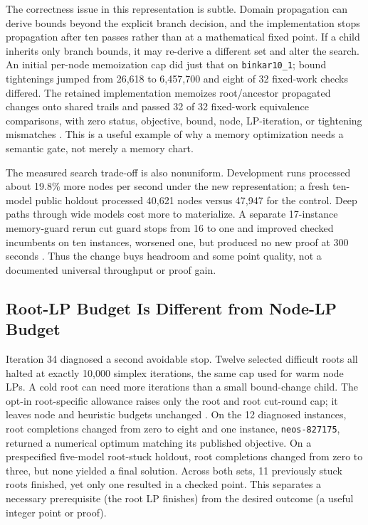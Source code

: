 \documentclass[10pt,a4paper,twocolumn]{article}
\begin{document}
The correctness issue in this representation is subtle. Domain propagation can derive bounds beyond the explicit branch decision, and the implementation stops propagation after ten passes rather than at a mathematical fixed point. If a child inherits only branch bounds, it may re-derive a different set and alter the search. An initial per-node memoization cap did just that on \texttt{binkar10\_1}; bound tightenings jumped from 26,618 to 6,457,700 and eight of 32 fixed-work checks differed. The retained implementation memoizes root/ancestor propagated changes onto shared trails and passed 32 of 32 fixed-work equivalence comparisons, with zero status, objective, bound, node, LP-iteration, or tightening mismatches \cite{iter33}. This is a useful example of why a memory optimization needs a semantic gate, not merely a memory chart.

The measured search trade-off is also nonuniform. Development runs processed about 19.8\% more nodes per second under the new representation; a fresh ten-model public holdout processed 40,621 nodes versus 47,947 for the control. Deep paths through wide models cost more to materialize. A separate 17-instance memory-guard rerun cut guard stops from 16 to one and improved checked incumbents on ten instances, worsened one, but produced no new proof at 300 seconds \cite{iter33}. Thus the change buys headroom and some point quality, not a documented universal throughput or proof gain.

\subsection{Root-LP Budget Is Different from Node-LP Budget}

Iteration 34 diagnosed a second avoidable stop. Twelve selected difficult roots all halted at exactly 10,000 simplex iterations, the same cap used for warm node LPs. A cold root can need more iterations than a small bound-change child. The opt-in root-specific allowance raises only the root and root cut-round cap; it leaves node and heuristic budgets unchanged \cite{iter34}. On the 12 diagnosed instances, root completions changed from zero to eight and one instance, \texttt{neos-827175}, returned a numerical optimum matching its published objective. On a prespecified five-model root-stuck holdout, root completions changed from zero to three, but none yielded a final solution. Across both sets, 11 previously stuck roots finished, yet only one resulted in a checked point. This separates a necessary prerequisite (the root LP finishes) from the desired outcome (a useful integer point or proof).
\end{document}
